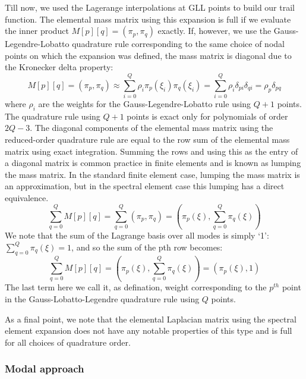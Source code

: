 \documentclass[
  a4paper,
  10pt]{article}
\begin{document}
Till now, we used the Lagerange interpolations at GLL points to build
our trail function. The elemental mass matrix using this expansion is
full if we evaluate the inner product \(M[p][q] = (\pi_p,\pi_q)\)
exactly. If, however, we use the Gauss-Legendre-Lobatto quadrature rule
corresponding to the same choice of nodal points on which the expansion
was defined, the mass matrix is diagonal due to the Kronecker delta
property: \begin{equation}
M[p][q] = (\pi_p,\pi_q) \approx\sum_{i=0}^{Q}\rho_i\pi_p(\xi_i)\pi_q(\xi_i) = \sum_{i=0}^{Q}\rho_i\delta_{pi}\delta_{qi} = \rho_p\delta_{pq}
\end{equation} where \(\rho_i\) are the weights for the
Gauss-Legendre-Lobatto rule using \(Q+1\) points. The quadrature rule
using \(Q + 1\) points is exact only for polynomials of order \(2Q-3\).
The diagonal components of the elemental mass matrix using the
reduced-order quadrature rule are equal to the row sum of the elemental
mass matrix using exact integration. Summing the rows and using this as
the entry of a diagonal matrix is common practice in finite elements and
is known as lumping the mass matrix. In the standard finite element
case, lumping the mass matrix is an approximation, but in the spectral
element case this lumping has a direct equivalence. \begin{equation}
\sum_{q=0}^Q M[p][q] = \sum_{q=0}^Q(\pi_p,\pi_q) =(\pi_p(\xi),\sum_{q=0}^Q\pi_q(\xi))
\end{equation} We note that the sum of the Lagrange basis over all modes
is simply `1': \(\sum_{q=0}^Q\pi_q(\xi)=1\), and so the sum of the pth
row becomes: \begin{equation}
\sum_{q=0}^Q M[p][q]  =(\pi_p(\xi),\sum_{q=0}^Q\pi_q(\xi))= (\pi_p(\xi),1)
\end{equation} The last term here we call it, as defination, weight
corresponding to the \(p^{th}\) point in the Gauss-Lobatto-Legendre
quadrature rule using \(Q\) points.

As a final point, we note that the elemental Laplacian matrix using the
spectral element expansion does not have any notable properties of this
type and is full for all choices of quadrature order.

\hypertarget{modal-approach}{%
\subsubsection{Modal approach}\label{modal-approach}}
\end{document}
